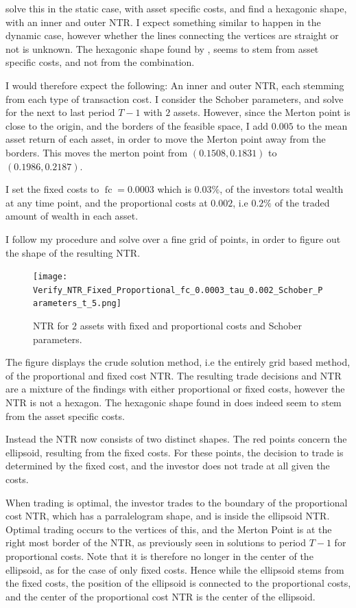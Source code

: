 \documentclass[11pt]{article}
\begin{document}
\autocite{Dybvig2020} solve this in the static case, with asset specific costs, and find a hexagonic shape, with an inner and outer NTR.
I expect something similar to happen in the dynamic case, however whether the lines connecting the vertices are straight or not is unknown.
The hexagonic shape found by \autocite{Dybvig2020}, seems to stem from asset specific costs, and not from the combination.

I would therefore expect the following: An inner and outer NTR, each stemming from each type of transaction cost.
I consider the Schober parameters, and solve for the next to last period $T-1$ with $2$ assets.
However, since the Merton point is close to the origin, and the borders of the feasible space, 
I add $0.005$ to the mean asset return of each asset, in order to move the Merton point away from the borders.
This moves the merton point from $(0.1508, 0.1831)$ to $(0.1986, 0.2187)$.

I set the fixed costs to $\operatorname{fc} =0.0003$ which is $0.03\%$,  of the investors total wealth at any time point,
and the proportional costs at $0.002$, i.e $0.2\%$ of the traded amount of wealth in each asset.

I follow my procedure and solve over a fine grid of points, in order to figure out the shape of the resulting \ac{NTR}.
\begin{figure}[!ht]
    \centering
    \texttt{[image: Verify\_NTR\_Fixed\_Proportional\_fc\_0.0003\_tau\_0.002\_Schober\_Parameters\_t\_5.png]}
    \caption{NTR for $2$ assets with fixed and proportional costs and Schober parameters.}
    \label{fig: Final_NTR_Fixed_Proportional}
\end{figure}

The figure displays the crude solution method, i.e the entirely grid based method, of the proportional and fixed cost NTR.
The resulting trade decisions and \ac{NTR} are a mixture of the findings with either proportional or fixed costs, however the NTR is not a hexagon.
The hexagonic shape found in \autocite{Dybvig2020} does indeed seem to stem from the asset specific costs.

Instead the \ac{NTR} now consists of two distinct shapes. The red points concern the ellipsoid, resulting from the fixed costs.
For these points, the decision to trade is determined by the fixed cost, and the investor does not trade at all given the costs.

When trading is optimal, the investor trades to the boundary of the proportional cost NTR, which has a parralelogram shape, and is inside the ellipsoid NTR.
Optimal trading occurs to the vertices of this, and the Merton Point is at the right most border of the NTR, as previously seen in solutions to period $T-1$ for proportional costs.
Note that it is therefore no longer in the center of the ellipsoid, as for the case of only fixed costs.
Hence while the ellipsoid stems from the fixed costs, the position of the ellipsoid is connected to the proportional costs, and the center of the proportional cost NTR is the center of the ellipsoid.
\end{document}
